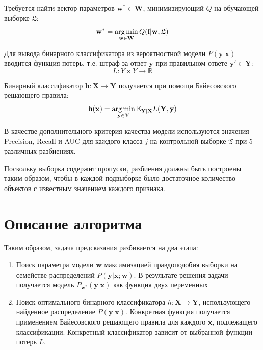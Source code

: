 \documentclass[12pt,twoside]{article}
\newcommand{\x}{\mathbf{x}}
\newcommand{\h}{\mathbf{h}}
\newcommand{\w}{\mathbf{w}}
\newcommand{\W}{\mathbf{W}}
\newcommand{\y}{\mathbf{y}}
\newcommand{\X}{\mathbf{X}}
\newcommand{\Y}{\mathbf{Y}}
\newcommand{\fs}{\mbox{f}}
\begin{document}
%

Требуется найти вектор параметров $\w^*\in\W$, минимизирующий $Q$ на обучающей выборке $\mathfrak{L}$:
	$$\w^*=\argmin_{\w\in\W}Q(\fs|\w,\mathfrak{L})$$

Для вывода бинарного классификатора из вероятностной модели $P(\y|\x)$ вводится функция потерь, т.е. штраф за ответ $\y$ при правильном ответе $\y'\in\Y$:
$$L\colon Y\times Y\to \mathbb{R}$$

Бинарный классификатор $\h\colon\X\to\Y$ получается \cite{weiwei2010} при помощи Байесовского решающего правила:
$$\h(\x)=\argmin\limits_{\y\in\Y}\mathbb{E}_{\Y|\X}L(\Y,\y)$$

В качестве дополнительного критерия качества модели используются значения Precision, Recall и AUC для каждого класса $j$ на контрольной выборке $\mathfrak{T}$ при 5 различных разбиениях.


Поскольку выборка содержит пропуски, разбиения должны быть построены таким образом, чтобы в каждой подвыборке было достаточное количество объектов с известным значением каждого признака.

\section{Описание алгоритма}
Таким образом, задача предсказания разбивается на два этапа:
\begin{enumerate}
\item Поиск параметра модели $\w$ максимизацией правдоподобия выборки на семействе распределений $P(\y|\x;\w)$. В результате решения задачи получается модель $P_{\w^*}(\y|\x)$ как функция двух переменных
\item Поиск оптимального бинарного классификатора $h\colon \X\to\Y$, использующего найденное распределение $P(\y|\x)$. Конкретная функция получается применением Байесовского решающего правила для каждого $\x$, подлежащего классификации. Конкретный классификатор зависит от выбранной функции потерь $L$.
\end{enumerate}
\end{document}
